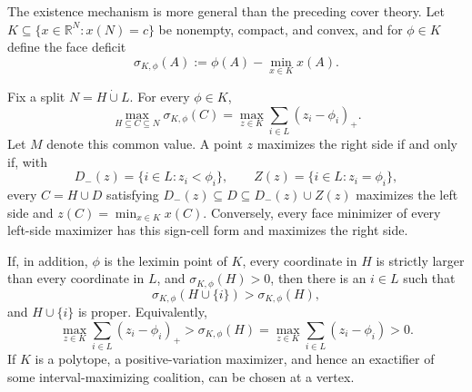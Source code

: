 The existence mechanism is more general than the preceding cover theory.
Let $K\subseteq\{x\in\mathbb R^N:x(N)=c\}$ be nonempty, compact, and
convex, and for $\phi\in K$ define the face deficit
\[
 \sigma_{K,\phi}(A):=\phi(A)-\min_{x\in K}x(A).
\]

\begin{theorem}
\label{thm:lx-face-ascent-geometry}
Fix a split $N=H\mathbin{\dot\cup}L$.  For every $\phi\in K$,
\[
 \max_{H\subseteq C\subseteq N}\sigma_{K,\phi}(C)
 =\max_{z\in K}\sum_{i\in L}(z_i-\phi_i)_+.        \tag{PV}
 \label{eq:lx-positive-variation-duality}
\]
Let $M$ denote this common value.  A point $z$ maximizes the right side if
and only if, with
\[
 D_-(z)=\{i\in L:z_i<\phi_i\},\qquad
 Z(z)=\{i\in L:z_i=\phi_i\},
\]
every $C=H\cup D$ satisfying
$D_-(z)\subseteq D\subseteq D_-(z)\cup Z(z)$ maximizes the left side and
$z(C)=\min_{x\in K}x(C)$.  Conversely, every face minimizer of every
left-side maximizer has this sign-cell form and maximizes the right side.

If, in addition, $\phi$ is the leximin point of $K$, every coordinate in
$H$ is strictly larger than every coordinate in $L$, and
$\sigma_{K,\phi}(H)>0$, then there is an $i\in L$ such that
\[
 \sigma_{K,\phi}(H\cup\{i\})>\sigma_{K,\phi}(H),   \tag{FA}
 \label{eq:lx-face-ascent}
\]
and $H\cup\{i\}$ is proper.  Equivalently,
\[
 \max_{z\in K}\sum_{i\in L}(z_i-\phi_i)_+
 >\sigma_{K,\phi}(H)
 =\max_{z\in K}\sum_{i\in L}(z_i-\phi_i)>0.       \tag{VG}
 \label{eq:lx-variation-gap}
\]
If $K$ is a polytope, a positive-variation maximizer, and hence an
exactifier of some interval-maximizing coalition, can be chosen at a vertex.
\end{theorem}

